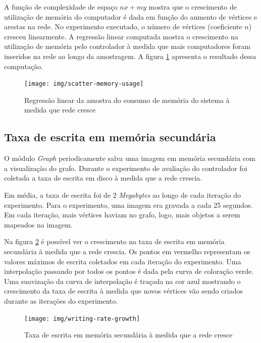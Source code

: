 A função de complexidade de espaço $nx + my$ mostra que o crescimento de
utilização de memória do computador é dada em função do aumento de vértices
e arestas na rede.
No experimento executado, o número de vértices (coeficiente $n$) cresceu
linearmente.
A regressão linear computada mostra o crescimento na utilização de memória
pelo controlador à medida que mais computadores foram inseridos na rede ao
longo da amostragem.
A figura \ref{fig:scatter-memory-usage} apresenta o resultado dessa
computação.

\begin{figure}[!htb]
    \centering
    \label{fig:scatter-memory-usage}
    \texttt{[image: img/scatter-memory-usage]}
    \caption{Regressão linear da amostra do consumo de memória do sistema
    à medida que rede cresce}
\end{figure}


\subsection{Taxa de escrita em memória secundária}

O módulo \emph{Graph} periodicamente salva uma imagem em memória secundária
com a visualização do grafo.
Durante o experimento de avaliação do controlador foi coletada a taxa de
escrita em disco à medida que a rede crescia.

Em média, a taxa de escrita foi de 2 \emph{Megabytes} ao longo de cada
iteração do experimento.
Para o experimento, uma imagem era gravada a cada 25 segundos.
Em cada iteração, mais vértices haviam no grafo, logo, mais objetos a serem
mapeados na imagem.

\break

Na figura \ref{fig:writing-rate-growth} é possível ver o crescimento na
taxa de escrita em memória secundária à medida que a rede crescia.
Os pontos em vermelho representam os valores máximos de escrita coletados
em cada iteração do experimento.
Uma interpolação passando por todos os pontos é dada pela curva de coloração
verde.
Uma suavização da curva de interpolação é traçada na cor azul mostrando
o crescimento da taxa de escrita à medida que novos vértices vão sendo criados
durante as iterações do experimento.

\begin{figure}[!htb]
    \centering
    \label{fig:writing-rate-growth}
    \texttt{[image: img/writing-rate-growth]}
    \caption{Taxa de escrita em memória secundária à medida que a rede cresce}
\end{figure}

